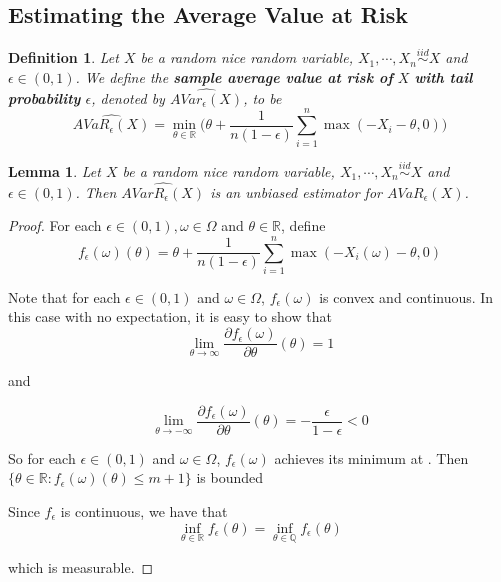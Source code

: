 \documentclass[12pt]{amsart}
\newtheorem{lem}[thm]{Lemma}
\newtheorem{defn}[thm]{Definition}
\newcommand{\ep}{\epsilon}
\newcommand{\om}{\omega}
\newcommand{\Om}{\Omega}
\newcommand{\R}{\mathbb{R}}
\newcommand{\Q}{\mathbb{Q}}
\begin{document}
\subsection{Estimating the Average Value at Risk}

\begin{defn}
Let $X$ be a random nice random variable, $X_1, \cdots , X_n \stackrel{iid}{\sim} X$ and $\ep \in (0,1)$. We define the \textbf{sample average value at risk of }$X$ \textbf{with tail probability } $\ep$, denoted by $\widehat{AVar_{\ep}(X)}$, to be $$\widehat{AVaR_{\ep}(X)} = \min_{\theta \in \R}\bigg(\theta + \frac{1}{n (1-\ep)} \sum_{i=1}^n\max(-X_i - \theta, 0) \bigg)$$ 
\end{defn}

\begin{lem}
Let $X$ be a random nice random variable, $X_1, \cdots , X_n \stackrel{iid}{\sim} X$ and $\ep \in (0,1)$. Then $\widehat{AVarR_{\ep}(X)}$ is an unbiased estimator for $AVaR_{\ep}(X)$. 
\end{lem}

\begin{proof}
For each $\ep \in (0,1), \om \in \Om$ and $\theta \in \R$, define $$f_{\ep}(\om)(\theta) = \theta + \frac{1}{n (1-\ep)} \sum_{i=1}^n\max(-X_i(\om) - \theta, 0) $$ 

Note that for each $\ep \in (0,1)$ and $\om \in \Om$, $f_{\ep}(\om)$ is convex and continuous. In this case with no expectation, it is easy to show that $$\lim_{\theta \rightarrow \infty}\frac{\partial f_{\ep}(\om)}{\partial \theta}(\theta) = 1$$

and
 
$$\lim_{\theta \rightarrow -\infty}\frac{\partial f_{\ep}(\om)}{\partial \theta}(\theta) = -\frac{\ep}{1-\ep} <0$$  

So for each $\ep \in (0,1)$ and $\om \in \Om$, $f_{\ep}(\om)$ achieves its minimum at . Then $\{\theta \in \R: f_{\ep}(\om)(\theta)\leq m+1\}$ is bounded

Since $f_{\ep}$ is continuous, we have that $$\inf_{\theta \in \R} f_{\ep}(\theta) = \inf_{\theta \in \Q} f_{\ep}(\theta)$$ 

which is measurable. 

\end{proof} 



\end{document}
